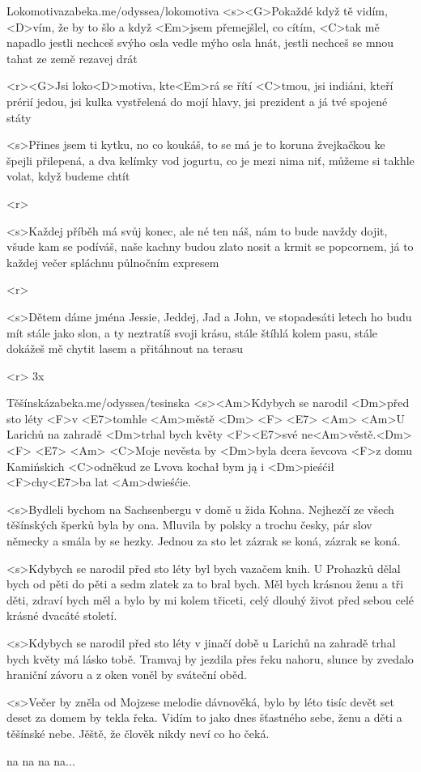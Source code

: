 \begin{song}[Poletíme?]{41}{Lokomotiva}{zabeka.me/odyssea/lokomotiva}
	<s><G>Pokaždé když tě vidím, <D>vím, že by to šlo
	a když <Em>jsem přemejšlel, co cítím, <C>tak mě napadlo
	jestli nechceš svýho osla vedle mýho osla hnát,
	jestli nechceš se mnou tahat ze země rezavej drát

	<r><G>Jsi loko<D>motiva, kte<Em>rá se řítí <C>tmou,
	jsi indiáni, kteří prérií jedou,
	jsi kulka vystřelená do mojí hlavy,
	jsi prezident a já tvé spojené státy

	<s>Přines jsem ti kytku, no co koukáš, to se má
	je to koruna žvejkačkou ke špejli přilepená,
	a dva kelímky vod jogurtu, co je mezi nima niť,
	můžeme si takhle volat, když budeme chtít

	<r>

	<s>Každej příběh má svůj konec, ale né ten náš,
	nám to bude navždy dojit, všude kam se podíváš,
	naše kachny budou zlato nosit a krmit se popcornem,
	já to každej večer spláchnu půlnočním expresem

	<r>

	<s>Dětem dáme jména Jessie, Jeddej, Jad a John,
	ve stopadesáti letech ho budu mít stále jako slon,
	a ty neztratíš svoji krásu, stále štíhlá kolem pasu,
	stále dokážeš mě chytit lasem a přitáhnout na terasu

	<r>
	3x

\end{song}
\begin{song}{42}{Těšínská}{zabeka.me/odyssea/tesinska}
	<s><Am>Kdybych se narodil <Dm>před sto léty
	<F>v <E7>tomhle <Am>městě <Dm> <F> <E7> <Am>
	<Am>U Larichů na zahradě <Dm>trhal bych květy
	<F><E7>své ne<Am>věstě.<Dm> <F> <E7> <Am>
	<C>Moje nevěsta by <Dm>byla dcera ševcova
	<F>z domu Kamińskich <C>odněkud ze Lvova
	kochał bym ją i <Dm>pieśćił <F>chy<E7>ba lat <Am>dwieśćie.

	<s>Bydleli bychom na Sachsenbergu v domě u žida Kohna.
	Nejhezčí ze všech těšínských šperků byla by ona.
	Mluvila by polsky a trochu česky,
	pár slov německy a smála by se hezky.
	Jednou za sto let zázrak se koná, zázrak se koná.

	<s>Kdybych se narodil před sto léty byl bych vazačem knih.
	U Prohazků dělal bych od pěti do pěti a sedm zlatek za to bral bych.
	Měl bych krásnou ženu a tři děti,
	zdraví bych měl a bylo by mi kolem třiceti,
	celý dlouhý život před sebou celé krásné dvacáté století.

	<s>Kdybych se narodil před sto léty v jinačí době
	u Larichů na zahradě trhal bych květy má lásko tobě.
	Tramvaj by jezdila přes řeku nahoru,
	slunce by zvedalo hraniční závoru
	a z oken voněl by sváteční oběd.

	<s>Večer by zněla od Mojzese melodie dávnověká,
	bylo by léto tisíc devět set deset za domem by tekla řeka.
	Vidím to jako dnes šťastného sebe,
	ženu a děti a těšínské nebe.
	Jěště, že člověk nikdy neví co ho čeká.

	na na na na...

\end{song}
